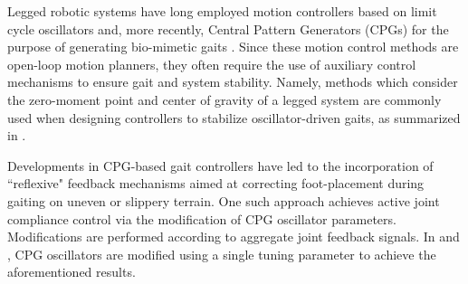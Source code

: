
Legged robotic systems have long employed motion controllers based on limit cycle oscillators and, more recently, Central Pattern Generators (CPGs)  for the purpose of generating bio-mimetic gaits \cite{Matsuoka1985,Collins1993,Endo2004,Righetti2006,Ijspeert2008,Matos2010,Ajallooeian2013,Park2014,Fukuoka2015}. Since these motion control methods are open-loop motion planners, 
they often require the use of auxiliary control mechanisms to ensure gait and system stability. Namely, methods which consider the zero-moment point and center of gravity of a legged system are commonly used when designing controllers to stabilize oscillator-driven gaits, as summarized in \cite{Wieber2015}. %

Developments in CPG-based gait controllers have led to the incorporation of ``reflexive" feedback mechanisms aimed at correcting foot-placement during gaiting on uneven or slippery terrain. One such approach achieves active joint compliance control via the modification of CPG oscillator parameters. Modifications are performed according to aggregate joint feedback signals. In \cite{Endo2004} and \cite{Fukuoka2003}, CPG oscillators are modified using a single tuning parameter to achieve the aforementioned results.


